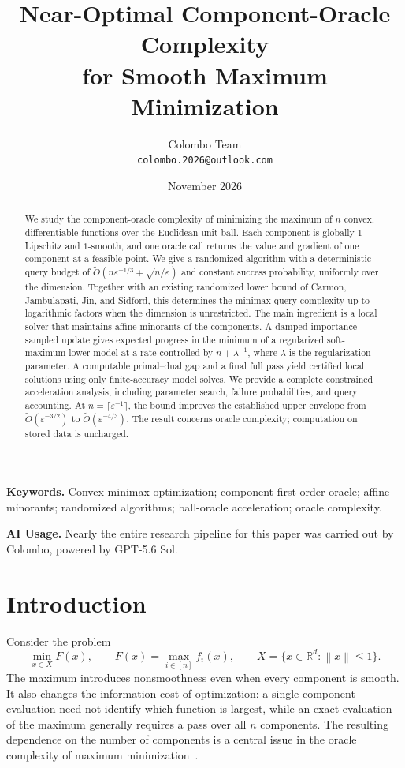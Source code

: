 \documentclass[11pt,a4paper]{article}
\title{Near-Optimal Component-Oracle Complexity\\
for Smooth Maximum Minimization}
\author{Colombo Team\\[3pt]
  \texttt{colombo.2026@outlook.com}}
\date{November 2026}
\theoremstyle{definition}\newtheorem{definition}[theorem]{Definition}
\theoremstyle{remark}\newtheorem{remark}[theorem]{Remark}
\newcommand{\R}{\mathbb R}
\newcommand{\eps}{\varepsilon}
\newcommand{\norm}[1]{\left\|#1\right\|}
\begin{document}
\maketitle

\begin{abstract}
We study the component-oracle complexity of minimizing the maximum of $n$
convex, differentiable functions over the Euclidean unit ball. Each component
is globally $1$-Lipschitz and $1$-smooth, and one oracle call returns the value
and gradient of one component at a feasible point. We give a randomized
algorithm with a deterministic query budget of
$\widetilde O(n\eps^{-1/3}+\sqrt{n/\eps})$ and constant success probability,
uniformly over the dimension. Together with an existing randomized lower
bound of Carmon, Jambulapati, Jin, and Sidford, this determines the minimax
query complexity up to logarithmic factors when the dimension is unrestricted.
The main ingredient is a local solver that maintains affine minorants of the
components. A damped importance-sampled update gives expected progress in the minimum
of a regularized soft-maximum lower model at a rate controlled by
$n+\lambda^{-1}$, where $\lambda$ is the regularization parameter. A computable
primal--dual gap and a final full pass yield certified local solutions using
only finite-accuracy model solves. We provide a complete constrained
acceleration analysis, including parameter search, failure probabilities,
and query accounting. At $n=\lceil\eps^{-1}\rceil$, the bound improves the
established upper envelope from $\widetilde O(\eps^{-3/2})$ to
$\widetilde O(\eps^{-4/3})$. The result concerns oracle complexity;
computation on stored data is uncharged.
\end{abstract}

\noindent\textbf{Keywords.}
Convex minimax optimization; component first-order oracle; affine minorants;
randomized algorithms; ball-oracle acceleration; oracle complexity.

\medskip
\begin{samepage}
\noindent\textbf{AI Usage.}
Nearly the entire research pipeline for this paper was carried out by
Colombo, powered by GPT-5.6 Sol.
\par
\end{samepage}

\section{Introduction}\label{sec:intro}
Consider the problem
\begin{equation}\label{eq:problem}
  \min_{x\in X} F(x),\qquad
  F(x)=\max_{i\in[n]}f_i(x),\qquad
  X=\{x\in\R^d:\norm{x}\le1\}.
\end{equation}
The maximum introduces nonsmoothness even when every component is smooth.
It also changes the information cost of optimization: a single component
evaluation need not identify which function is largest, while an exact
evaluation of the maximum generally requires a pass over all $n$ components.
The resulting dependence on the number of components is a central issue in
the oracle complexity of maximum minimization~\cite{inside,ballgame}.
\end{document}
